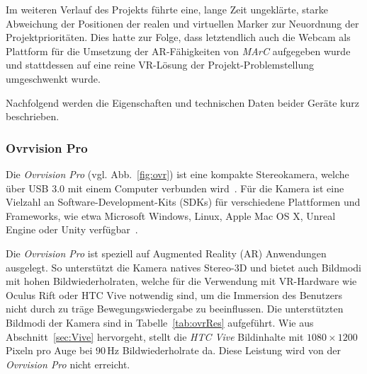 Im weiteren Verlauf des Projekts führte eine, lange Zeit ungeklärte, starke Abweichung der Positionen der realen und virtuellen Marker zur Neuordnung der Projektprioritäten. Dies hatte zur Folge, dass letztendlich auch die Webcam als Plattform für die Umsetzung der AR-Fähigkeiten von \emph{MArC} aufgegeben wurde und stattdessen auf eine reine VR-Lösung der Projekt-Problemstellung umgeschwenkt wurde.

Nachfolgend werden die Eigenschaften und technischen Daten beider Geräte kurz beschrieben.

\subsubsection{Ovrvision Pro}\label{sec:ovrvision}%
Die \emph{Ovrvision Pro} (vgl. Abb.~\ref{fig:ovr}) ist eine kompakte Stereokamera, welche über USB 3.0 mit einem Computer verbunden wird~\cite{website:ovrvision}. Für die Kamera ist eine Vielzahl an Software-Development-Kits (SDKs) für verschiedene Plattformen und Frameworks, wie etwa Microsoft Windows, Linux, Apple Mac OS X, Unreal Engine oder Unity verfügbar~\cite{website:ovrvisionSetup}.

Die \emph{Ovrvision Pro} ist speziell auf Augmented Reality (AR) Anwendungen ausgelegt. So unterstützt die Kamera natives Stereo-3D und bietet auch Bildmodi mit hohen Bildwiederholraten, welche für die Verwendung mit VR-Hardware wie Oculus Rift oder HTC Vive notwendig sind, um die Immersion des Benutzers nicht durch zu träge Bewegungswiedergabe zu beeinflussen. Die unterstützten Bildmodi der Kamera sind in Tabelle~\ref{tab:ovrRes} aufgeführt. Wie aus Abschnitt~\ref{sec:Vive} hervorgeht, stellt die \textit{HTC Vive} Bildinhalte mit $1080\times1200$\,Pixeln pro Auge bei $90$\,Hz Bildwiederholrate da. Diese Leistung wird von der \emph{Ovrvision Pro} nicht erreicht.

